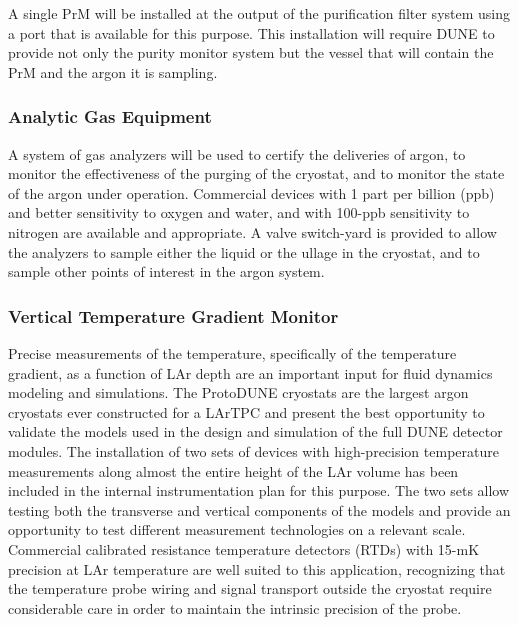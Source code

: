 A single PrM will be installed at the output of the purification filter system using a port that is available for this purpose. This installation will require DUNE to provide not only the purity monitor system but the vessel that will contain the PrM and the argon it is sampling.


\subsubsection{Analytic Gas Equipment}

A system of gas analyzers will be used to certify the deliveries of argon, to monitor the effectiveness of the purging of the cryostat, and to monitor the state of the argon under operation. Commercial devices with 1 part per billion (ppb) and better sensitivity to oxygen and water, and with 100-ppb sensitivity to nitrogen are available and appropriate. A valve switch-yard is provided to allow the analyzers to sample either the liquid or the ullage in the cryostat, and to sample other points of interest in the argon system.


\subsubsection{Vertical Temperature Gradient Monitor}

	Precise %
	measurements of the temperature, specifically of the temperature gradient, %
	as a function of LAr depth are %
	an important input for fluid dynamics modeling and simulations.  The ProtoDUNE cryostats are the largest argon cryostats ever constructed for a LArTPC and present the best opportunity to validate the models used in the design and simulation of the full DUNE detector modules. The installation of two sets of devices with high-precision temperature measurements
	along almost the entire height of the LAr volume %
	has been included in the internal instrumentation plan for this purpose. The two sets allow testing both the transverse and vertical components of the models and provide an opportunity to test different measurement technologies on a relevant scale. 
	Commercial calibrated resistance temperature detectors (RTDs) with 15-mK precision at LAr temperature are well suited to this application, recognizing that the temperature probe wiring and signal transport outside the cryostat require considerable care in order to maintain %
	the intrinsic precision of the probe.
	
